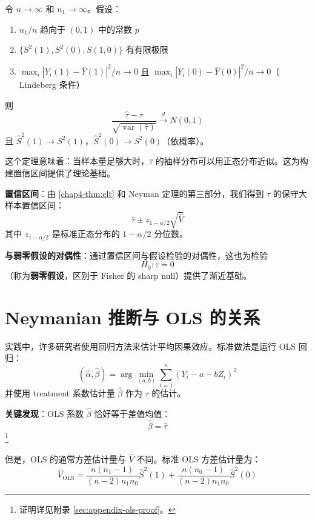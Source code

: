 \begin{Theorem}\label{chap4-thm:clt}
令 $n \to \infty$ 和 $n_1 \to \infty$。假设：
\begin{enumerate}
  \item $n_1/n$ 趋向于 $(0,1)$ 中的常数 $p$
  \item $\{S^2(1), S^2(0), S(1,0)\}$ 有有限极限
  \item $\max_i |Y_i(1) - \bar{Y}(1)|^2 / n \to 0$ 且 $\max_i |Y_i(0) - \bar{Y}(0)|^2 / n \to 0$（ Lindeberg 条件）
\end{enumerate}
则
\[
\frac{\hat{\tau} - \tau}{\sqrt{\operatorname{var}(\hat{\tau})}} \xrightarrow{d} N(0,1)
\]
且 $\hat{S}^2(1) \to S^2(1)$，$\hat{S}^2(0) \to S^2(0)$（依概率）。
\end{Theorem}

这个定理意味着：当样本量足够大时，$\hat{\tau}$ 的抽样分布可以用正态分布近似。这为构建置信区间提供了理论基础。

\textbf{置信区间}：由 \cref{chap4-thm:clt} 和 Neyman 定理的第三部分，我们得到 $\tau$ 的保守大样本置信区间：
\[
\hat{\tau} \pm z_{1-\alpha/2}\sqrt{\hat{V}}
\]
其中 $z_{1-\alpha/2}$ 是标准正态分布的 $1-\alpha/2$ 分位数。

\textbf{与弱零假设的对偶性}：通过置信区间与假设检验的对偶性，这也为检验
\[
H_0: \tau = 0
\]
（称为\textbf{弱零假设}，区别于 Fisher 的 sharp null）提供了渐近基础。


\section{Neymanian 推断与 OLS 的关系}\label{sec:4-7}

实践中，许多研究者使用回归方法来估计平均因果效应。标准做法是运行 OLS 回归：
\[
(\hat{\alpha}, \hat{\beta}) = \arg\min_{(a,b)}\sum_{i=1}^n (Y_i - a - b Z_i)^2
\]
并使用 treatment 系数估计量 $\hat{\beta}$ 作为 $\tau$ 的估计。

\textbf{关键发现}：OLS 系数 $\hat{\beta}$ 恰好等于差值均值：
\begin{equation}\label{eq:4-3}\tag{4.3}
\hat{\beta} = \hat{\tau}
\end{equation}
\footnote{证明详见附录 \cref{sec:appendix-ols-proof}。}

但是，OLS 的通常方差估计量与 $\hat{V}$ 不同。标准 OLS 方差估计量为：
\begin{equation}\label{eq:4-4}
\hat{V}_{\text{OLS}} = \frac{n(n_1-1)}{(n-2)n_1 n_0}\hat{S}^2(1) + \frac{n(n_0-1)}{(n-2)n_1 n_0}\hat{S}^2(0)
\end{equation}

